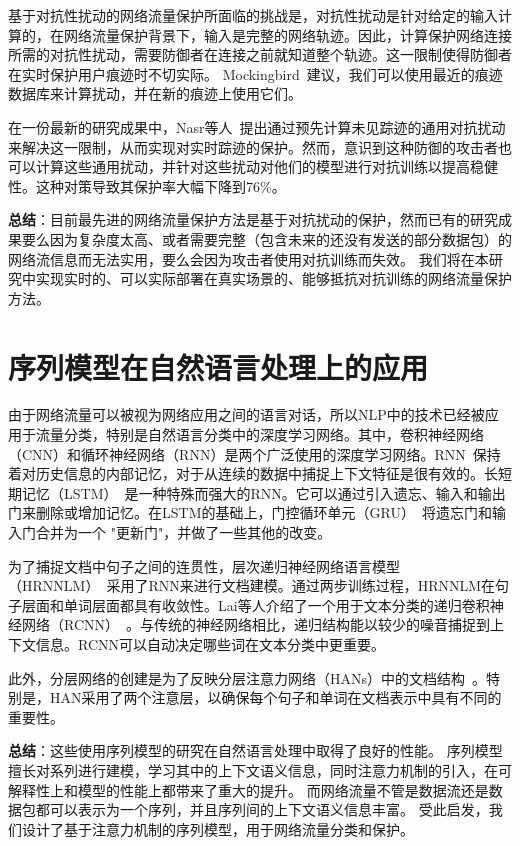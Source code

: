 \documentclass[degree=master,cjk-font=noto]{thuthesis}
\begin{document}
基于对抗性扰动的网络流量保护所面临的挑战是，对抗性扰动是针对给定的输入计算的，在网络流量保护背景下，输入是完整的网络轨迹。因此，计算保护网络连接所需的对抗性扰动，需要防御者在连接之前就知道整个轨迹。这一限制使得防御者在实时保护用户痕迹时不切实际。
Mockingbird~\cite{9265277}建议，我们可以使用最近的痕迹数据库来计算扰动，并在新的痕迹上使用它们。

在一份最新的研究成果中，Nasr等人~\cite{272174}提出通过预先计算未见踪迹的通用对抗扰动来解决这一限制，从而实现对实时踪迹的保护。然而，意识到这种防御的攻击者也可以计算这些通用扰动，并针对这些扰动对他们的模型进行对抗训练以提高稳健性。这种对策导致其保护率大幅下降到76\%。

\textbf{总结}：目前最先进的网络流量保护方法是基于对抗扰动的保护，然而已有的研究成果要么因为复杂度太高、或者需要完整（包含未来的还没有发送的部分数据包）的网络流信息而无法实用，要么会因为攻击者使用对抗训练而失效。
我们将在本研究中实现实时的、可以实际部署在真实场景的、能够抵抗对抗训练的网络流量保护方法。

\section{序列模型在自然语言处理上的应用}

由于网络流量可以被视为网络应用之间的语言对话，所以NLP中的技术已经被应用于流量分类，特别是自然语言分类中的深度学习网络。其中，卷积神经网络（CNN）和循环神经网络（RNN）是两个广泛使用的深度学习网络。RNN~\cite{RNN}保持着对历史信息的内部记忆，对于从连续的数据中捕捉上下文特征是很有效的。长短期记忆（LSTM）~\cite{LSTM}是一种特殊而强大的RNN。它可以通过引入遗忘、输入和输出门来删除或增加记忆。在LSTM的基础上，门控循环单元（GRU）~\cite{GRU}将遗忘门和输入门合并为一个 "更新门"，并做了一些其他的改变。

为了捕捉文档中句子之间的连贯性，层次递归神经网络语言模型（HRNNLM）~\cite{b28}采用了RNN来进行文档建模。通过两步训练过程，HRNNLM在句子层面和单词层面都具有收敛性。Lai等人介绍了一个用于文本分类的递归卷积神经网络（RCNN）~\cite{b27}。与传统的神经网络相比，递归结构能以较少的噪音捕捉到上下文信息。RCNN可以自动决定哪些词在文本分类中更重要。

此外，分层网络的创建是为了反映分层注意力网络（HANs）中的文档结构~\cite{b29}。特别是，HAN采用了两个注意层，以确保每个句子和单词在文档表示中具有不同的重要性。

\textbf{总结}：这些使用序列模型的研究在自然语言处理中取得了良好的性能。
序列模型擅长对系列进行建模，学习其中的上下文语义信息，同时注意力机制的引入，在可解释性上和模型的性能上都带来了重大的提升。
而网络流量不管是数据流还是数据包都可以表示为一个序列，并且序列间的上下文语义信息丰富。
受此启发，我们设计了基于注意力机制的序列模型，用于网络流量分类和保护。
\end{document}
